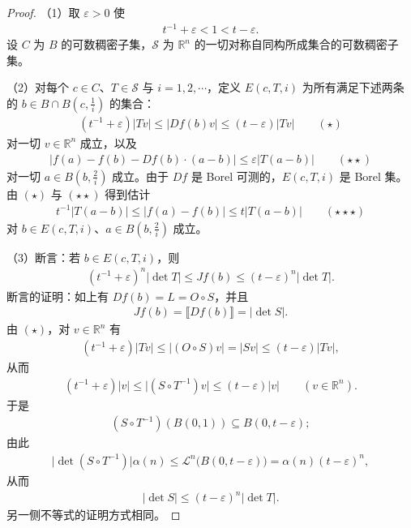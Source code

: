 \documentclass[../../main.tex]{subfiles}%
\begin{document}
\begin{proof}
（1）取 $\varepsilon>0$ 使
\begin{align*}
t^{-1}+\varepsilon<1<t-\varepsilon .
\end{align*}
设 $C$ 为 $B$ 的可数稠密子集，$\mathcal{S}$ 为 $\mathbb{R}^n$ 的一切对称自同构所成集合的可数稠密子集。

（2）对每个 $c\in C$、$T\in\mathcal{S}$ 与 $i=1,2,\cdots$，定义 $E(c,T,i)$ 为所有满足下述两条的 $b\in B\cap B(c,\frac1i)$ 的集合：
\begin{align*}
(t^{-1}+\varepsilon)\lvert Tv\rvert\leqslant\lvert Df(b)v\rvert\leqslant(t-\varepsilon)\lvert Tv\rvert\qquad(\star)
\end{align*}
对一切 $v\in\mathbb{R}^n$ 成立，以及
\begin{align*}
\lvert f(a)-f(b)-Df(b)\cdot(a-b)\rvert\leqslant\varepsilon\lvert T(a-b)\rvert\qquad(\star\star)
\end{align*}
对一切 $a\in B(b,\frac2i)$ 成立。由于 $Df$ 是 Borel 可测的，$E(c,T,i)$ 是 Borel 集。由 $(\star)$ 与 $(\star\star)$ 得到估计
\begin{align*}
t^{-1}\lvert T(a-b)\rvert\leqslant\lvert f(a)-f(b)\rvert\leqslant t\lvert T(a-b)\rvert\qquad(\star\star\star)
\end{align*}
对 $b\in E(c,T,i)$、$a\in B(b,\frac2i)$ 成立。

（3）断言：若 $b\in E(c,T,i)$，则
\begin{align*}
(t^{-1}+\varepsilon)^n\lvert\det T\rvert\leqslant Jf(b)\leqslant(t-\varepsilon)^n\lvert\det T\rvert .
\end{align*}
断言的证明：如上有 $Df(b)=L=O\circ S$，并且
\begin{align*}
Jf(b)=\llbracket Df(b)\rrbracket=\lvert\det S\rvert .
\end{align*}
由 $(\star)$，对 $v\in\mathbb{R}^n$ 有
\begin{align*}
(t^{-1}+\varepsilon)\lvert Tv\rvert\leqslant\lvert(O\circ S)v\rvert=\lvert Sv\rvert\leqslant(t-\varepsilon)\lvert Tv\rvert ,
\end{align*}
从而
\begin{align*}
(t^{-1}+\varepsilon)\lvert v\rvert\leqslant\lvert(S\circ T^{-1})v\rvert\leqslant(t-\varepsilon)\lvert v\rvert\qquad(v\in\mathbb{R}^n).
\end{align*}
于是
\begin{align*}
(S\circ T^{-1})(B(0,1))\subseteq B(0,t-\varepsilon);
\end{align*}
由此
\begin{align*}
\lvert\det(S\circ T^{-1})\rvert\alpha(n)\leqslant\mathcal{L}^n\bigl(B(0,t-\varepsilon)\bigr)=\alpha(n)(t-\varepsilon)^n,
\end{align*}
从而
\begin{align*}
\lvert\det S\rvert\leqslant(t-\varepsilon)^n\lvert\det T\rvert .
\end{align*}
另一侧不等式的证明方式相同。


\end{proof}
\end{document}
